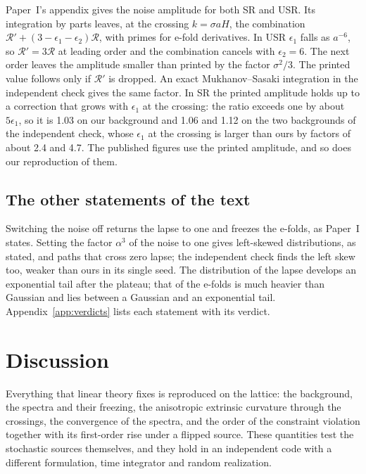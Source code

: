\documentclass[aps,prd,twocolumn,10pt,superscriptaddress,nofootinbib,longbibliography,floatfix]{revtex4-2}
\newcommand{\Pone}{Paper~I}
\begin{document}
\Pone{}'s appendix gives the noise amplitude for both SR and USR. Its integration by parts leaves, at the crossing $k = \sigma a H$, the combination $\mathcal{R}' + (3 - \epsilon_1 - \epsilon_2)\mathcal{R}$, with primes for e-fold derivatives. In USR $\epsilon_1$ falls as $a^{-6}$, so $\mathcal{R}' = 3\mathcal{R}$ at leading order and the combination cancels with $\epsilon_2 = 6$. The next order leaves the amplitude smaller than printed by the factor $\sigma^2/3$. The printed value follows only if $\mathcal{R}'$ is dropped. An exact Mukhanov--Sasaki integration in the independent check gives the same factor. In SR the printed amplitude holds up to a correction that grows with $\epsilon_1$ at the crossing: the ratio exceeds one by about $5\epsilon_1$, so it is 1.03 on our background and 1.06 and 1.12 on the two backgrounds of the independent check, whose $\epsilon_1$ at the crossing is larger than ours by factors of about 2.4 and 4.7. The published figures use the printed amplitude, and so does our reproduction of them.

\subsection{The other statements of the text}\label{sec:statements}

Switching the noise off returns the lapse to one and freezes the e-folds, as \Pone{} states. Setting the factor $\alpha^3$ of the noise to one gives left-skewed distributions, as stated, and paths that cross zero lapse; the independent check finds the left skew too, weaker than ours in its single seed. The distribution of the lapse develops an exponential tail after the plateau; that of the e-folds is much heavier than Gaussian and lies between a Gaussian and an exponential tail. Appendix~\ref{app:verdicts} lists each statement with its verdict.

\section{Discussion}\label{sec:discussion}

Everything that linear theory fixes is reproduced on the lattice: the background, the spectra and their freezing, the anisotropic extrinsic curvature through the crossings, the convergence of the spectra, and the order of the constraint violation together with its first-order rise under a flipped source. These quantities test the stochastic sources themselves, and they hold in an independent code with a different formulation, time integrator and random realization.
\end{document}
